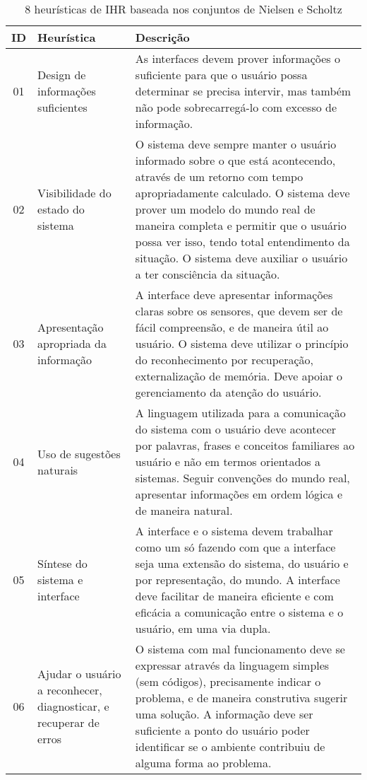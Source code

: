 \begin{table}[!ht]
	\caption{8 heurísticas de IHR baseada nos conjuntos de Nielsen e Scholtz}
	\label{tab:heuristicasihr}
	\centering
	\begin{tabular}{ c | m{4cm} | m{10cm} }
		\hline
		ID & Heurística & Descrição \\
		\hline
		01 & Design de informações suficientes & As interfaces devem prover informações o suficiente para que o usuário possa determinar se precisa intervir, mas também não pode sobrecarregá-lo com excesso de informação. \\
		\hline
        02 & Visibilidade do estado do sistema & O sistema deve sempre manter o usuário informado sobre o que está acontecendo, através de um retorno com tempo apropriadamente calculado. O sistema deve prover um modelo do mundo real de maneira completa e permitir que o usuário possa ver isso, tendo total entendimento da situação. O sistema deve auxiliar o usuário a ter consciência da situação. \\
		\hline
        03 & Apresentação apropriada da informação & A interface deve apresentar informações claras sobre os sensores, que devem ser de fácil compreensão, e de maneira útil ao usuário. O sistema deve utilizar o princípio do reconhecimento por recuperação, externalização de memória. Deve apoiar o gerenciamento da atenção do usuário. \\
		\hline
        04 & Uso de sugestões naturais & A linguagem utilizada para a comunicação do sistema com o usuário deve acontecer por palavras, frases e conceitos familiares ao usuário e não em termos orientados a sistemas. Seguir convenções do mundo real, apresentar informações em ordem lógica e de maneira natural. \\
		\hline
        05 & Síntese do sistema e interface & A interface e o sistema devem trabalhar como um só fazendo com que a interface seja uma extensão do sistema, do usuário e por representação, do mundo. A interface deve facilitar de maneira eficiente e com eficácia a comunicação entre o sistema e o usuário, em uma via dupla. \\
		\hline
        06 & Ajudar o usuário a reconhecer, diagnosticar, e recuperar de erros & O sistema com mal funcionamento deve se expressar através da linguagem simples (sem códigos), precisamente indicar o problema, e de maneira construtiva sugerir uma solução. A informação deve ser suficiente a ponto do usuário poder identificar se o ambiente contribuiu de alguma forma ao problema. \\

\end{tabular}
\end{table}
